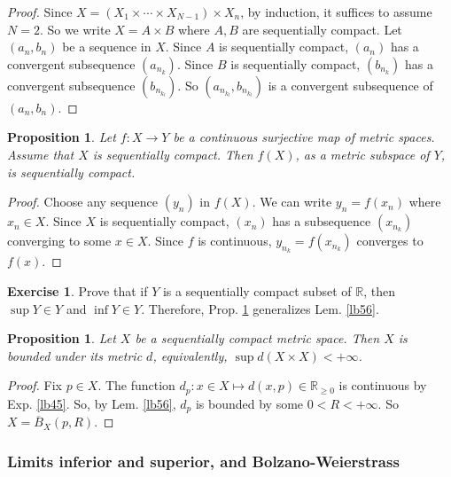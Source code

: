\documentclass[12pt,b5paper,notitlepage]{article}
\theoremstyle{definition}
\newtheorem{exe}[df]{Exercise}
\theoremstyle{plain}
\newtheorem{pp}[df]{Proposition}
\newcommand{\ovl}{\overline}
\newcommand{\Rbb}{\mathbb R}
\numberwithin{equation}{section}
\begin{document}
\begin{proof}
Since $X=(X_1\times\cdots\times X_{N-1})\times X_n$, by induction, it suffices to assume $N=2$. So we write $X=A\times B$ where $A,B$ are sequentially compact. Let $(a_n,b_n)$ be a sequence in $X$. Since $A$ is sequentially compact, $(a_n)$ has a convergent subsequence $(a_{n_k})$. Since $B$ is sequentially compact, $(b_{n_k})$ has a convergent subsequence $(b_{n_{k_l}})$. So $(a_{n_{k_l}},b_{n_{k_l}})$ is a convergent subsequence of $(a_n,b_n)$.
\end{proof}


\begin{pp}\label{lb62}
Let $f:X\rightarrow Y$ be a continuous surjective map of metric spaces. Assume that $X$ is sequentially compact. Then $f(X)$, as a metric subspace of $Y$, is sequentially compact.
\end{pp}

\begin{proof}
Choose any sequence $(y_n)$ in $f(X)$. We can write $y_n=f(x_n)$ where $x_n\in X$. Since $X$ is sequentially compact, $(x_n)$ has a subsequence $(x_{n_k})$ converging to some $x\in X$. Since $f$ is continuous, $y_{n_k}=f(x_{n_k})$ converges to $f(x)$.
\end{proof}


\begin{exe}\label{lb63}
Prove that if $Y$ is a sequentially compact subset of $\Rbb$, then $\sup Y\in Y$ and $\inf Y\in Y$. Therefore, Prop. \ref{lb62} generalizes Lem. \ref{lb56}.
\end{exe}

\begin{pp}\label{lb71}
Let $X$ be a sequentially compact metric space. Then $X$ is bounded under its metric $d$, equivalently, $\sup d(X\times X)<+\infty$.
\end{pp}

\begin{proof}
Fix $p\in X$. The function $d_p:x\in X\mapsto d(x,p)\in\Rbb_{\geq 0}$ is continuous by Exp. \ref{lb45}. So, by Lem. \ref{lb56}, $d_p$ is bounded by some $0<R<+\infty$. So $X=\ovl B_X(p,R)$.
\end{proof} 






\subsubsection{Limits inferior and superior, and Bolzano-Weierstrass}\label{lb69}
\end{document}
